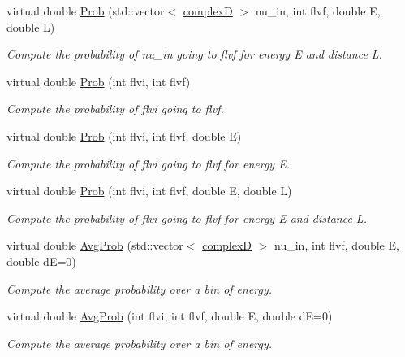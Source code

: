 \begin{DoxyCompactItemize}
virtual double \hyperlink{classOscProb_1_1PMNS__Base_a01fba31729345376705e02408e835f67}{Prob} (std\+::vector$<$ \hyperlink{EigenPoint_8h_a67ca8e107e20610c3fff78d5e726ece0}{complexD} $>$ nu\+\_\+in, int flvf, double E, double L)
\begin{DoxyCompactList}\small\item\em Compute the probability of nu\+\_\+in going to flvf for energy E and distance L. \end{DoxyCompactList}\item 
virtual double \hyperlink{classOscProb_1_1PMNS__Base_aec5c399b93261f1962a4b7dbbb44b973}{Prob} (int flvi, int flvf)
\begin{DoxyCompactList}\small\item\em Compute the probability of flvi going to flvf. \end{DoxyCompactList}\item 
virtual double \hyperlink{classOscProb_1_1PMNS__Base_aa3cee10639d5c0879ccb9e78d62128d3}{Prob} (int flvi, int flvf, double E)
\begin{DoxyCompactList}\small\item\em Compute the probability of flvi going to flvf for energy E. \end{DoxyCompactList}\item 
virtual double \hyperlink{classOscProb_1_1PMNS__Base_a6e0a74508d9d6db7be02e242b8467563}{Prob} (int flvi, int flvf, double E, double L)
\begin{DoxyCompactList}\small\item\em Compute the probability of flvi going to flvf for energy E and distance L. \end{DoxyCompactList}\item 
virtual double \hyperlink{classOscProb_1_1PMNS__Base_a89e54c80ae8a31effbab7b2b970606bb}{Avg\+Prob} (std\+::vector$<$ \hyperlink{EigenPoint_8h_a67ca8e107e20610c3fff78d5e726ece0}{complexD} $>$ nu\+\_\+in, int flvf, double E, double dE=0)
\begin{DoxyCompactList}\small\item\em Compute the average probability over a bin of energy. \end{DoxyCompactList}\item 
virtual double \hyperlink{classOscProb_1_1PMNS__Base_ac03f754160422e6600da8dbae0f803ed}{Avg\+Prob} (int flvi, int flvf, double E, double dE=0)
\begin{DoxyCompactList}\small\item\em Compute the average probability over a bin of energy. \end{DoxyCompactList}\item 

\end{DoxyCompactItemize}
